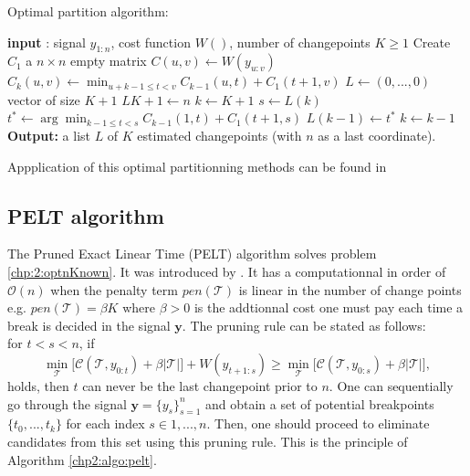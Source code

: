 \begin{algorithm}[ht]
\caption{Optimal partition algorithm:}\label{chp2:algo:opt}
\begin{algorithmic}

\State \textbf{input} : signal $y_{1:n}$, cost function $W()$, number of changepoints $K \geq 1$
\State Create $C_1$ a $n\times n$ empty matrix
  \State $C(u,v) \gets W(y_{u:v})$
\EndFor
{}
      \State $C_k(u,v) \gets \min_{u+k-1 \leq t < v} C_{k-1}(u,t) + C_1(t+1,v)$ 
    \EndFor
  \EndFor
\EndIf
\State $L \gets (0,...,0)$ vector of size $K+1$
\State $L{K+1} \gets n$
\State $k \gets K+1$
  \State $s \gets L(k)$
  \State $t^* \gets \arg\min_{k-1\leq t < s}C_{k-1}(1,t)+C_1(t+1,s)$
  \State $L(k-1) \gets t^*$
  \State $k \gets k-1$
\EndWhile
\State \textbf{Output:} a list $L$ of $K$ estimated changepoints (with $n$ as a last coordinate).
\end{algorithmic}
\end{algorithm} 

Appplication of this optimal partitionning methods can be found in \cite{rigaill2015pruned,Lavielle1997,perron2006dealing}

\subsection{PELT algorithm}\label{chp2:pelt}

The Pruned Exact Linear Time (PELT) algorithm solves problem \ref{chp:2:optnKnown}. It was introduced by \cite{Killick2012}. It has a computationnal in order of $\mathcal{O}(n)$ when the penalty term $pen(\mathcal{T})$ is linear in the number of change points e.g. $pen(\mathcal{T}) = \beta K$ where $\beta > 0$ is the addtionnal cost one must pay each time a break is decided in the signal $\bm y$. The pruning rule can be stated as follows: \\
for $t<s < n$, if
\begin{equation}\label{chp2:pruning}
 \min_{\mathcal{T}}\bigg[\mathcal{C}(\mathcal{T},y_{0:t})+\beta\lvert \mathcal{T}\rvert\bigg] + W(y_{t+1:s}) \geq \min_{\mathcal{T}}\bigg[\mathcal{C}(\mathcal{T},y_{0:s})+\beta\lvert \mathcal{T}\rvert\bigg], 
\end{equation}
holds, then $t$ can never be the last changepoint prior to $n$.   
One can sequentially go through the signal $\bm y = \{y_s\}_{s=1}^n$ and obtain a set of potential breakpoints $\{t_0,...,t_k\}$ for each index $s \in {1,...,n}$. Then, one should proceed to eliminate candidates from this set using this pruning rule. This is the principle of Algorithm \ref{chp2:algo:pelt}.

